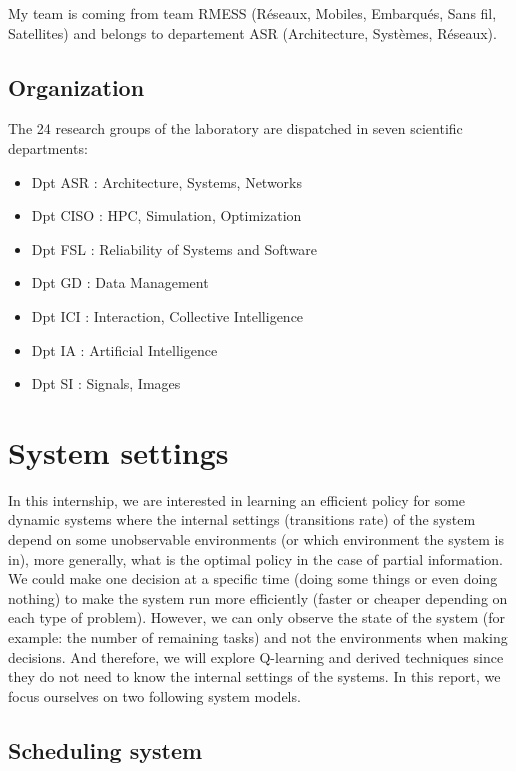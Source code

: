 \documentclass[
  a4paper, xcolor = usenames,dvipsnames]{article}
\providecommand{\tightlist}{%
  \setlength{\itemsep}{0pt}\setlength{\parskip}{0pt}}
\theoremstyle{definition}
\theoremstyle{definition}
\theoremstyle{definition}
\theoremstyle{definition}
\theoremstyle{remark}
\begin{document}
My team is coming from team RMESS (Réseaux, Mobiles, Embarqués, Sans fil, Satellites) and belongs to departement ASR (Architecture, Systèmes, Réseaux).

\hypertarget{organization}{%
\subsection{Organization}\label{organization}}

The 24 research groups of the laboratory are dispatched in seven scientific departments:

\begin{itemize}
\tightlist
\item
  Dpt ASR : Architecture, Systems, Networks
\item
  Dpt CISO : HPC, Simulation, Optimization
\item
  Dpt FSL : Reliability of Systems and Software
\item
  Dpt GD : Data Management
\item
  Dpt ICI : Interaction, Collective Intelligence
\item
  Dpt IA : Artificial Intelligence
\item
  Dpt SI : Signals, Images
\end{itemize}

\hypertarget{system-settings}{%
\section{System settings}\label{system-settings}}

In this internship, we are interested in learning an efficient policy for some dynamic systems where the internal settings (transitions rate) of the system depend on some unobservable environments (or which environment the system is in), more generally, what is the optimal policy in the case of partial information. We could make one decision at a specific time (doing some things or even doing nothing) to make the system run more efficiently (faster or cheaper depending on each type of problem). However, we can only observe the state of the system (for example: the number of remaining tasks) and not the environments when making decisions. And therefore, we will explore Q-learning and derived techniques since they do not need to know the internal settings of the systems. In this report, we focus ourselves on two following system models.

\hypertarget{scheduling-system}{%
\subsection{Scheduling system}\label{scheduling-system}}
\end{document}
